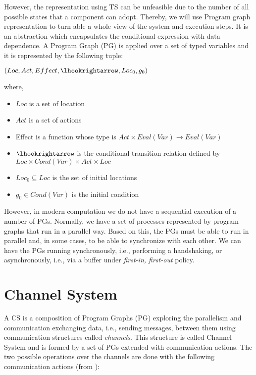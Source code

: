 However, the representation using TS can be unfeasible due to the number of all possible states that a component can adopt. Thereby, we will use Program graph representation to turn able a whole view of the system and execution steps. It is an abstraction which encapsulates the conditional expression with data dependence. A Program Graph (PG) is applied over a set of typed variables and it is represented by the following tuple:

\begin{center}
    $(Loc,Act,Effect,\lhookrightarrow,Loc_0,g_0)$
\end{center}

where,

\begin{itemize}
	\item $Loc$ is a set of location  
	\item $Act$ is a set of actions
	\item Effect is a function whose type is $Act \times Eval(Var) \to Eval(Var)$
	\item $\lhookrightarrow$ is the conditional transition relation defined by $Loc \times Cond(Var) \times Act \times Loc$
	\item $Loc_0 \subseteq Loc$ is the set of initial locations
	\item $g_0 \in Cond(Var)$ is the initial condition
\end{itemize}

However, in modern computation we do not have a sequential execution of a number of PGs. Normally, we have a set of processes represented by program graphs that run in a parallel way. Based on this, the PGs must be able to run in parallel and, in some cases, to be able to synchronize with each other. We can have the PGs running synchronously, i.e., performing a handshaking, or asynchronously, i.e., via a buffer under \textit{first-in, first-out} policy.



\section {Channel System}

A CS is a composition  of Program Graphs (PG) exploring the parallelism and communication exchanging data, i.e., sending messages, between them using communication structures called \textit{channels}\cite{baier}. This structure is called Channel System and is formed by a set of PGs extended with communication actions. The two possible operations over the channels are done with the following communication actions (from \cite{baier}):

